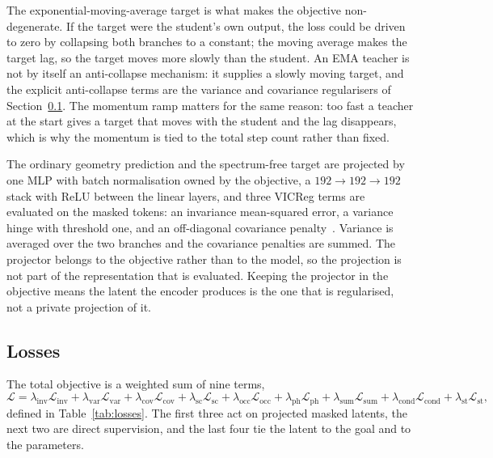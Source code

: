 \documentclass[pdflatex,oneside,sn-mathphys-num]{sn-jnl}
\theoremstyle{thmstyleone}
\theoremstyle{thmstyletwo}
\theoremstyle{thmstylethree}
\begin{document}
The exponential-moving-average target is what makes the objective non-degenerate.
If the target were the student's own output, the loss could be driven to zero by
collapsing both branches to a constant; the moving average makes the target lag,
so the target moves more slowly than the student. An EMA teacher is not by itself an
anti-collapse mechanism: it supplies a slowly moving target, and the explicit anti-collapse
terms are the variance and covariance regularisers of Section~\ref{sec:losses}. The
momentum ramp matters for the same reason: too fast a teacher at the start gives a
target that moves with the student and the lag disappears, which is why the
momentum is tied to the total step count rather than fixed.

The ordinary geometry prediction and the spectrum-free target are projected by one MLP with
batch normalisation owned by the objective, a $192\to192\to192$ stack with ReLU between the
linear layers, and three VICReg terms are evaluated on the masked tokens: an invariance
mean-squared error, a variance hinge with threshold one, and an off-diagonal covariance
penalty~\cite{vicreg}. Variance is averaged over the two branches and the covariance
penalties are summed. The projector belongs to the objective rather than to the model, so the
projection is not part of the representation that is evaluated. Keeping the projector in the
objective means the latent the encoder produces is the one that is regularised, not a
private projection of it.

\subsection{Losses}\label{sec:losses}

The total objective is a weighted sum of nine terms,
\begin{equation}
\mathcal{L}=
\lambda_{\mathrm{inv}}\mathcal{L}_{\mathrm{inv}}
+\lambda_{\mathrm{var}}\mathcal{L}_{\mathrm{var}}
+\lambda_{\mathrm{cov}}\mathcal{L}_{\mathrm{cov}}
+\lambda_{\mathrm{sc}}\mathcal{L}_{\mathrm{sc}}
+\lambda_{\mathrm{occ}}\mathcal{L}_{\mathrm{occ}}
+\lambda_{\mathrm{ph}}\mathcal{L}_{\mathrm{ph}}
+\lambda_{\mathrm{sum}}\mathcal{L}_{\mathrm{sum}}
+\lambda_{\mathrm{cond}}\mathcal{L}_{\mathrm{cond}}
+\lambda_{\mathrm{st}}\mathcal{L}_{\mathrm{st}},
\label{eq:loss}
\end{equation}
defined in Table~\ref{tab:losses}. The first three act on projected masked latents, the
next two are direct supervision, and the last four tie the latent to the goal and to
the parameters.
\end{document}

